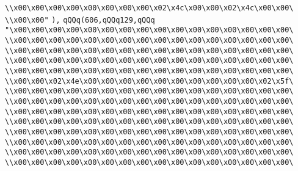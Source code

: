 \verb|\\x00\x00\x00\x00\x00\x00\x00\x00\x02\x4c\x00\x00\x02\x4c\x00\x00\|\newline
\verb|\\x00\x00"|\newline
\verb|),|\newline
\verb|qQQq(606,qQQq129,qQQq|\newline
\verb|"\x00\x00\x00\x00\x00\x00\x00\x00\x00\x00\x00\x00\x00\x00\x00\x00\|\newline
\verb|\\x00\x00\x00\x00\x00\x00\x00\x00\x00\x00\x00\x00\x00\x00\x00\x00\|\newline
\verb|\\x00\x00\x00\x00\x00\x00\x00\x00\x00\x00\x00\x00\x00\x00\x00\x00\|\newline
\verb|\\x00\x00\x00\x00\x00\x00\x00\x00\x00\x00\x00\x00\x00\x00\x00\x00\|\newline
\verb|\\x00\x00\x00\x00\x00\x00\x00\x00\x00\x00\x00\x00\x00\x00\x00\x00\|\newline
\verb|\\x00\x00\x02\x4e\x00\x00\x00\x00\x00\x00\x00\x00\x00\x00\x02\x5f\|\newline
\verb|\\x00\x00\x00\x00\x00\x00\x00\x00\x00\x00\x00\x00\x00\x00\x00\x00\|\newline
\verb|\\x00\x00\x00\x00\x00\x00\x00\x00\x00\x00\x00\x00\x00\x00\x00\x00\|\newline
\verb|\\x00\x00\x00\x00\x00\x00\x00\x00\x00\x00\x00\x00\x00\x00\x00\x00\|\newline
\verb|\\x00\x00\x00\x00\x00\x00\x00\x00\x00\x00\x00\x00\x00\x00\x00\x00\|\newline
\verb|\\x00\x00\x00\x00\x00\x00\x00\x00\x00\x00\x00\x00\x00\x00\x00\x00\|\newline
\verb|\\x00\x00\x00\x00\x00\x00\x00\x00\x00\x00\x00\x00\x00\x00\x00\x00\|\newline
\verb|\\x00\x00\x00\x00\x00\x00\x00\x00\x00\x00\x00\x00\x00\x00\x00\x00\|\newline
\verb|\\x00\x00\x00\x00\x00\x00\x00\x00\x00\x00\x00\x00\x00\x00\x00\x00\|\newline
